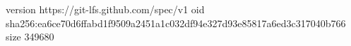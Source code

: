 version https://git-lfs.github.com/spec/v1
oid sha256:ea6ce70d6ffabd1f9509a2451a1c032df94e327d93e85817a6ed3c317040b766
size 349680
